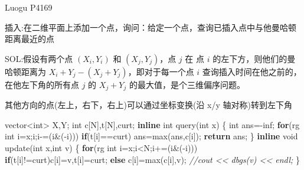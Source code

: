 \documentclass[
]{article}
\newenvironment{Shaded}{}{}
\newcommand{\CommentTok}[1]{\textcolor[rgb]{0.38,0.63,0.69}{\textit{#1}}}
\newcommand{\ControlFlowTok}[1]{\textcolor[rgb]{0.00,0.44,0.13}{\textbf{#1}}}
\newcommand{\DataTypeTok}[1]{\textcolor[rgb]{0.56,0.13,0.00}{#1}}
\newcommand{\KeywordTok}[1]{\textcolor[rgb]{0.00,0.44,0.13}{\textbf{#1}}}
\newcommand{\NormalTok}[1]{#1}
\begin{document}
Luogu P4169

插入:在二维平面上添加一个点，询问：给定一个点，查询已插入点中与他曼哈顿距离最近的点

SOL:假设有两个点 \((X_{i},Y_{i})\) 和 \((X_{j},Y_{j})\)，点 \(j\) 在 点
\(i\) 的左下方，则他们的曼哈顿距离为
\(X_{i}+Y_{j}-(X_{j}+Y_{j})\)，即对于每一个点 \(i\)
查询插入时间在他之前的，在他左下角的所有点 \(j\) 的 \(X_{j}+Y_{j}\)
的最大值，是个三维偏序问题。

其他方向的点(左上，右下，右上)可以通过坐标变换(沿 x/y 轴对称)转到左下角

\begin{Shaded}
\begin{Highlighting}[]
\NormalTok{vector\textless{}}\DataTypeTok{int}\NormalTok{\textgreater{} X,Y;}
\DataTypeTok{int}\NormalTok{ c[N],t[N],curt;}
\KeywordTok{inline} \DataTypeTok{int}\NormalTok{ query(}\DataTypeTok{int}\NormalTok{ x)}
\NormalTok{\{}
    \DataTypeTok{int}\NormalTok{ ans={-}inf;}
    \ControlFlowTok{for}\NormalTok{(rg }\DataTypeTok{int}\NormalTok{ i=x;i;i{-}=(i\&({-}i)))}
        \ControlFlowTok{if}\NormalTok{(t[i]==curt)}
\NormalTok{            ans=max(ans,c[i]);}
    \ControlFlowTok{return}\NormalTok{ ans;}
\NormalTok{\}}
\KeywordTok{inline} \DataTypeTok{void}\NormalTok{ update(}\DataTypeTok{int}\NormalTok{ x,}\DataTypeTok{int}\NormalTok{ v)}
\NormalTok{\{}
    \ControlFlowTok{for}\NormalTok{(rg }\DataTypeTok{int}\NormalTok{ i=x;i\textless{}N;i+=(i\&({-}i)))}
        \ControlFlowTok{if}\NormalTok{(t[i]!=curt)c[i]=v,t[i]=curt;}
        \ControlFlowTok{else}\NormalTok{ c[i]=max(c[i],v);}
    \CommentTok{//cout \textless{}\textless{} dbgs(v) \textless{}\textless{} endl;}
\NormalTok{\}}


\end{Highlighting}
\end{Shaded}
\end{document}
